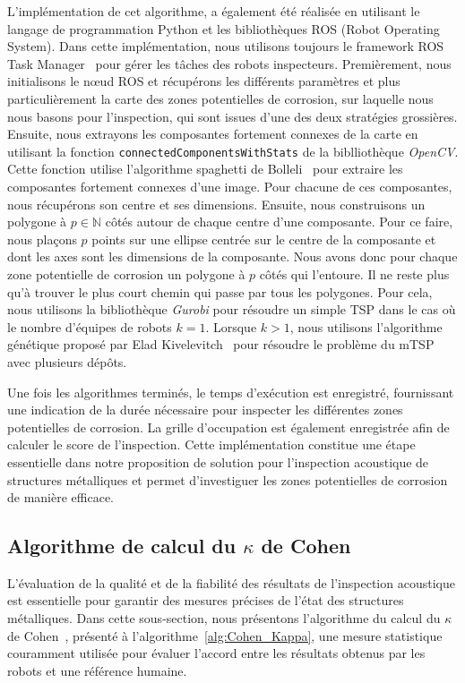 \documentclass[francais,RandD]{rapportPFE}
\begin{document}
			L'implémentation de cet algorithme, a également été réalisée en utilisant le langage de programmation Python et les bibliothèques ROS (Robot Operating System).
			Dans cette implémentation, nous utilisons toujours le framework ROS Task Manager~\cite{ROSTaskManager} pour gérer les tâches des robots inspecteurs.
			Premièrement, nous initialisons le nœud ROS et récupérons les différents paramètres et plus particulièrement la carte des zones potentielles de corrosion, sur laquelle nous nous basons pour l'inspection, qui sont issues d'une des deux stratégies grossières.
			Ensuite, nous extrayons les composantes fortement connexes de la carte en utilisant la fonction \texttt{connectedComponentsWithStats} de la biblliothèque \textit{OpenCV}.
			Cette fonction utilise l'algorithme spaghetti de Bolleli~\cite{BolelliSpaghetti} pour extraire les composantes fortement connexes d'une image.
			Pour chacune de ces composantes, nous récupérons son centre et ses dimensions.
			Ensuite, nous construisons un polygone à $p \in \mathbb{N}$ côtés autour de chaque centre d'une composante.
			Pour ce faire, nous plaçons $p$ points sur une ellipse centrée sur le centre de la composante et dont les axes sont les dimensions de la composante.
			Nous avons donc pour chaque zone potentielle de corrosion un polygone à $p$ côtés qui l'entoure.
			Il ne reste plus qu'à trouver le plus court chemin qui passe par tous les polygones.
			Pour cela, nous utilisons la bibliothèque \textit{Gurobi} pour résoudre un simple TSP dans le cas où le nombre d'équipes de robots $k = 1$.
			Lorsque $k > 1$, nous utilisons l'algorithme génétique proposé par Elad Kivelevitch~\cite{MDMTSPV_GA} pour résoudre le problème du mTSP avec plusieurs dépôts.

			Une fois les algorithmes terminés, le temps d'exécution est enregistré, fournissant une indication de la durée nécessaire pour inspecter les différentes zones potentielles de corrosion.
			La grille d'occupation est également enregistrée afin de calculer le score de l'inspection.
			Cette implémentation constitue une étape essentielle dans notre proposition de solution pour l'inspection acoustique de structures métalliques et permet d'investiguer les zones potentielles de corrosion de manière efficace.
		\subsection*{Algorithme de calcul du $\kappa$ de Cohen}
			L'évaluation de la qualité et de la fiabilité des résultats de l'inspection acoustique est essentielle pour garantir des mesures précises de l'état des structures métalliques.
			Dans cette sous-section, nous présentons l'algorithme du calcul du $\kappa$ de Cohen~\cite{enwiki:1130024730}, présenté à l'algorithme~\ref{alg:Cohen_Kappa}, une mesure statistique couramment utilisée pour évaluer l'accord entre les résultats obtenus par les robots et une référence humaine.
\end{document}

